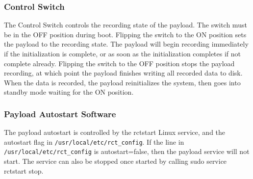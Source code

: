 \documentclass{report}
\begin{document}
				\subsubsection{Control Switch}
					The Control Switch controls the recording state of the payload.  The switch must be in the OFF position during boot.  Flipping the switch to the ON position sets the payload to the recording state.  The payload will begin recording immediately if the initialization is complete, or as soon as the initialization completes if not complete already.  Flipping the switch to the OFF position stops the payload recording, at which point the payload finishes writing all recorded data to disk.  When the data is recorded, the payload reinitializes the system, then goes into standby mode waiting for the ON position.
				\subsubsection{Payload Autostart Software}
					The payload autostart is controlled by the rctstart Linux service, and the autostart flag in \lstinline{/usr/local/etc/rct_config}.  If the line in \lstinline{/usr/local/etc/rct_config} is autostart=false, then the payload service will not start.  The service can also be stopped once started by calling sudo service rctstart stop.
	\appendix
	\printglossaries
\end{document}
